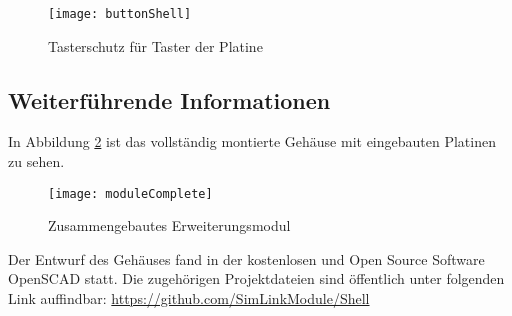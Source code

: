 \begin{figure}[h]
    \centering
    \texttt{[image: buttonShell]}
    \caption{Tasterschutz für Taster der Platine}
    \label{fig:buttonShell}
\end{figure}

\subsection{Weiterführende Informationen}
In Abbildung \ref{fig:moduleComplete} ist das vollständig montierte Gehäuse mit eingebauten Platinen zu sehen.

\begin{figure}[h]
    \centering
    \texttt{[image: moduleComplete]}
    \caption{Zusammengebautes Erweiterungsmodul}
    \label{fig:moduleComplete}
\end{figure}

Der Entwurf des Gehäuses fand in der kostenlosen und Open Source Software OpenSCAD \cite{aboutOpenScad} statt. Die zugehörigen Projektdateien sind öffentlich unter folgenden Link auffindbar: \url{https://github.com/SimLinkModule/Shell}